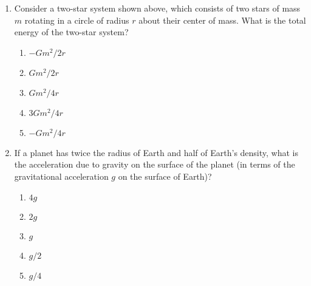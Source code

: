 \documentclass{../../../oss-apphys}
\begin{document}
\begin{multicols}{2}
\begin{enumerate}[leftmargin=18pt]
%
%    

  \item Consider a two-star system shown above, which consists of two stars of
    mass $m$ rotating in a circle of radius $r$ about their center of mass. What
    is the total energy of the two-star system?
    \begin{enumerate}[nosep,leftmargin=18pt,label=(\Alph*)]
    \item $-Gm^2/2r$
    \item $Gm^2/2r$
    \item $Gm^2/4r$
    \item $3Gm^2/4r$
    \item $-Gm^2/4r$
    \end{enumerate}

  \item If a planet has twice the radius of Earth and half of Earth's density,
    what is the acceleration due to gravity on the surface of the planet (in
    terms of the gravitational acceleration $g$ on the surface of Earth)?
    \begin{enumerate}[nosep,leftmargin=18pt,label=(\Alph*)]
    \item $4g$
    \item $2g$
    \item $g$
    \item $g/2$
    \item $g/4$
    \end{enumerate}
  \end{enumerate}
\end{multicols}
\end{document}

